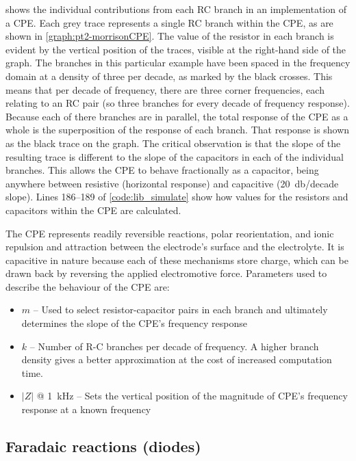      shows the individual contributions from each RC branch in an implementation of a CPE.
    Each grey trace represents a single RC branch within the CPE, as are shown in \cref{graph:pt2-morrisonCPE}.
    The value of the resistor in each branch is evident by the vertical position of the traces, visible at the right-hand side of the graph.
    The branches in this particular example have been spaced in the frequency domain at a density of three per decade, as marked by the black crosses.
    This means that per decade of frequency, there are three corner frequencies, each relating to an RC pair (so three branches for every decade of frequency response).
    Because each of there branches are in parallel, the total response of the CPE as a whole is the superposition of the response of each branch.
    That response is shown as the black trace on the graph.
    The critical observation is that the slope of the resulting trace is different to the slope of the capacitors in each of the individual branches.
    This allows the CPE to behave fractionally as a capacitor, being anywhere between resistive (horizontal response) and capacitive (\SI{20}{\decibel}/decade slope).
    Lines 186--189 of \cref{code:lib_simulate} show how values for the resistors and capacitors within the CPE are calculated.

    The CPE represents readily reversible reactions, polar reorientation, and ionic repulsion and attraction between the electrode's surface and the electrolyte.
    It is capacitive in nature because each of these mechanisms store charge, which can be drawn back by reversing the applied electromotive force.
    Parameters used to describe the behaviour of the CPE are:
    \begin{itemize}
      \item $m$ -- Used to select resistor-capacitor pairs in each branch and ultimately determines the slope of the CPE's frequency response
      \item $k$ -- \label{edit:alistair1} Number of R-C branches per decade of frequency. A higher branch density gives a better approximation at the cost of increased computation time.
      \item $|Z|$ @ \SI{1}{\kilo\hertz} -- Sets the vertical position of the magnitude of CPE's frequency response at a known frequency
    \end{itemize}



  \subsection{Faradaic reactions (diodes)}


